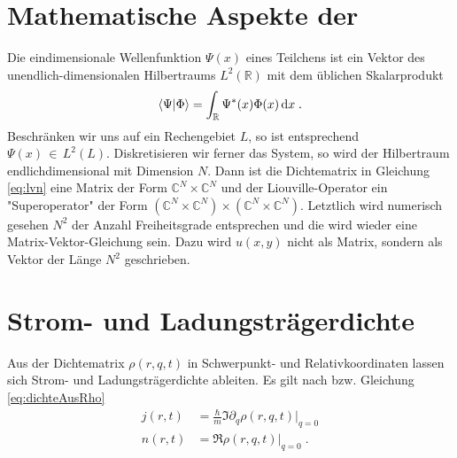 \section{Mathematische Aspekte der \lvn}
Die eindimensionale Wellenfunktion $\Psi(x)$ eines Teilchens ist ein Vektor des unendlich-dimensionalen Hilbertraums $L^2(\mathbb{R})$ mit dem üblichen Skalarprodukt
\begin{align}
  \bra{\Psi}\ket{\Phi} = \int_{\mathbb{R}} \Psi^*(x)\Phi(x) \mathop{}\!\mathrm{d} x \; .
\end{align}
Beschränken wir uns auf ein Rechengebiet $L$, so ist entsprechend $\Psi(x) \,\in\,L^2(L)$. Diskretisieren wir ferner das System, so wird der Hilbertraum endlichdimensional mit Dimension $N$. Dann ist die Dichtematrix in Gleichung \eqref{eq:lvn} eine Matrix der Form $\mathbb{C}^N \times \mathbb{C}^N$ und der Liouville-Operator ein "Superoperator" \cite{frensley2} der Form $(\mathbb{C}^N \times \mathbb{C}^N)\times(\mathbb{C}^N \times \mathbb{C}^N)$. Letztlich wird numerisch gesehen $N^2$ der Anzahl Freiheitsgrade entsprechen und die \lvn wird wieder eine Matrix-Vektor-Gleichung sein. Dazu wird $u(x,y)$ nicht als Matrix, sondern als Vektor der Länge $N^2$ geschrieben.



\section{Strom- und Ladungsträgerdichte}
Aus der Dichtematrix $\rho(r,q,t)$ in Schwerpunkt- und Relativkoordinaten lassen sich Strom- und Ladungsträgerdichte ableiten. Es gilt nach \cite{lukas1} bzw. Gleichung \eqref{eq:dichteAusRho}
\begin{align}
  j(r,t) &= \frac{\hbar}{m}\Im{\partial_q \rho(r,q,t)|_{q=0}} \\
  n(r,t) &= \Re{\rho(r,q,t)|_{q=0}} \; .
  \label{eq:dichte}
\end{align}

